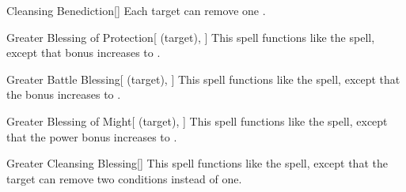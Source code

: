 \lowercase{\hypertarget{spell:Cleansing Benediction}{}}\label{spell:Cleansing Benediction}
\begin{freeability}[\nth{4}]{\hypertarget{spell:Cleansing Benediction}{Cleansing Benediction}}[]
Each target can remove one .
\end{freeability}
\vspace{0.25em}



\lowercase{\hypertarget{spell:Greater Blessing of Protection}{}}\label{spell:Greater Blessing of Protection}
\begin{attuneability}[\nth{4}]{\hypertarget{spell:Greater Blessing of Protection}{Greater Blessing of Protection}}[ (target), ]
This spell functions like the  spell, except that bonus increases to .
\end{attuneability}
\vspace{0.25em}



\lowercase{\hypertarget{spell:Greater Battle Blessing}{}}\label{spell:Greater Battle Blessing}
\begin{attuneability}[\nth{5}]{\hypertarget{spell:Greater Battle Blessing}{Greater Battle Blessing}}[ (target), ]
This spell functions like the  spell, except that the bonus increases to .
\end{attuneability}
\vspace{0.25em}



\lowercase{\hypertarget{spell:Greater Blessing of Might}{}}\label{spell:Greater Blessing of Might}
\begin{attuneability}[\nth{5}]{\hypertarget{spell:Greater Blessing of Might}{Greater Blessing of Might}}[ (target), ]
This spell functions like the  spell, except that the power bonus increases to .
\end{attuneability}
\vspace{0.25em}



\lowercase{\hypertarget{spell:Greater Cleansing Blessing}{}}\label{spell:Greater Cleansing Blessing}
\begin{freeability}[\nth{5}]{\hypertarget{spell:Greater Cleansing Blessing}{Greater Cleansing Blessing}}[]
This spell functions like the  spell, except that the target can remove two conditions instead of one.
\end{freeability}
\vspace{0.25em}



